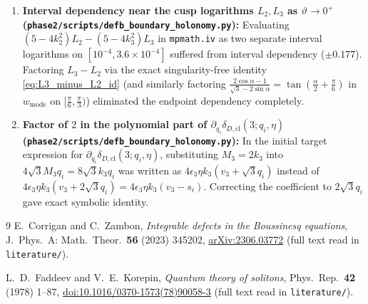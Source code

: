 \documentclass[11pt,a4paper]{article}
\theoremstyle{remark}
\newcommand{\shol}{\texttt{phase2/\allowbreak scripts/\allowbreak defb\_\allowbreak boundary\_\allowbreak holonomy.py}}
\begin{document}
\begin{enumerate}
together with the exact cancelled rational integrand \eqref{eq:Esub_rat_u} on
$z=1/u \in [0,1]$ gave $70$-digit agreement ($4.81\times 10^{-72}$).
\item \textbf{Interval dependency near the cusp logarithms $L_2,L_3$ as $\vartheta \to 0^+$ (\shol):}
Evaluating $(5-4k_2^2)L_2 - (5-4k_3^2)L_3$ in \texttt{mpmath.iv} as two
separate interval logarithms on $[10^{-4},3.6\times 10^{-4}]$ suffered from
interval dependency ($\pm 0.177$). Factoring $L_3 - L_2$ via the exact
singularity-free identity \eqref{eq:L3_minus_L2_id} (and similarly factoring
$\frac{2\cos\alpha-1}{\sqrt{3}-2\sin\alpha} = \tan(\frac{\alpha}{2}+\frac{\pi}{6})$
in $w_{\mathrm{mode}}$ on $[\frac{\pi}{6},\frac{\pi}{3})$) eliminated the
endpoint dependency completely.
\item \textbf{Factor of $2$ in the polynomial part of $\partial_{q_i}\delta_{D,\mathrm{cl}}(3;q_i,\eta)$ (\shol):}
In the initial target expression for $\partial_{q_i}\delta_{D,\mathrm{cl}}(3;q_i,\eta)$,
substituting $M_3 = 2k_3$ into $4\sqrt{3}M_3 q_i = 8\sqrt{3}k_3 q_i$ was written
as $4\epsilon_3\eta k_3(v_3 + \sqrt{3}q_i)$ instead of
$4\epsilon_3\eta k_3(v_3 + 2\sqrt{3}q_i) = 4\epsilon_3\eta k_3(v_3 - s_i)$.
Correcting the coefficient to $2\sqrt{3}q_i$ gave exact symbolic identity.
\end{enumerate}

\begin{thebibliography}{9}
E.~Corrigan and C.~Zambon,
\emph{Integrable defects in the Boussinesq equations},
J.~Phys.~A: Math.~Theor.\ \textbf{56} (2023) 345202,
\href{https://arxiv.org/abs/2306.03772}{arXiv:2306.03772}
(full text read in \texttt{literature/}).

L.~D.~Faddeev and V.~E.~Korepin,
\emph{Quantum theory of solitons},
Phys.~Rep.\ \textbf{42} (1978) 1--87,
\href{https://doi.org/10.1016/0370-1573(78)90058-3}{doi:10.1016/0370-1573(78)90058-3}
(full text read in \texttt{literature/}).
\end{thebibliography}
\end{document}
